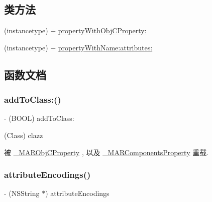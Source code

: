 \subsection*{类方法}
\begin{DoxyCompactItemize}
\item 
(instancetype) + \hyperlink{interface_m_a_r_property_ad9ec091c853566446e7080749db2a599}{property\+With\+Obj\+C\+Property\+:}
\item 
(instancetype) + \hyperlink{interface_m_a_r_property_a4bc8b22d1498d6544428c0b12ba8ad52}{property\+With\+Name\+:attributes\+:}
\end{DoxyCompactItemize}


\subsection{函数文档}
\mbox{\label{interface_m_a_r_property_a820be7200a12cbb0dde67453030a6f90}} 
\subsubsection{\texorpdfstring{add\+To\+Class\+:()}{addToClass:()}}
{\footnotesize\ttfamily -\/ (B\+O\+OL) add\+To\+Class\+: \begin{DoxyParamCaption}\item[{(Class)}]{clazz }\end{DoxyParamCaption}}



被 \hyperlink{interface___m_a_r_obj_c_property_a48f66f3c21b47da3c9edb39f4dcf0c01}{\+\_\+\+M\+A\+R\+Obj\+C\+Property} , 以及 \hyperlink{interface___m_a_r_components_property_a4199443a1614ab878f3a552d14ebad71}{\+\_\+\+M\+A\+R\+Components\+Property} 重载.

\mbox{\label{interface_m_a_r_property_a132d5700e141118918fb049deaf1673d}} 
\subsubsection{\texorpdfstring{attribute\+Encodings()}{attributeEncodings()}}
{\footnotesize\ttfamily -\/ (N\+S\+String $\ast$) attribute\+Encodings \begin{DoxyParamCaption}{ }\end{DoxyParamCaption}}



